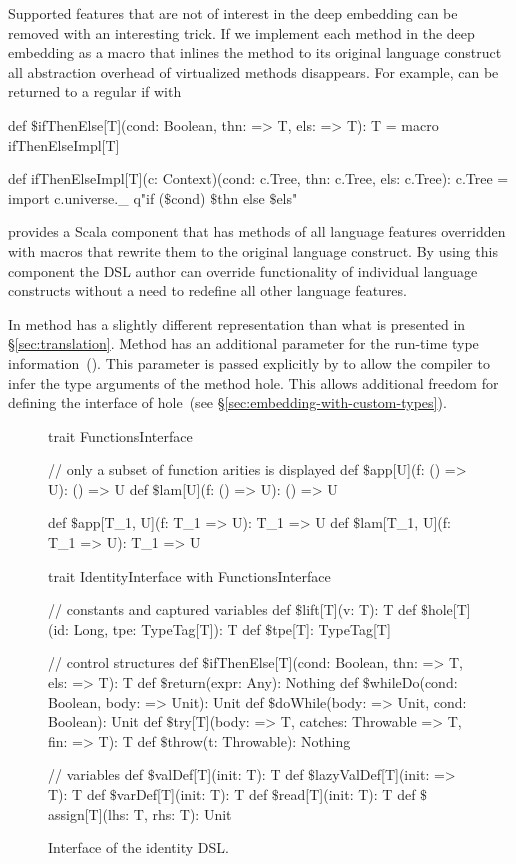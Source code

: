 Supported features that are not of interest in the deep embedding
 can be removed with an interesting trick. If we implement each method in the deep embedding as a macro
 that inlines the method to its original language construct all abstraction overhead of virtualized methods
 disappears. For example,  can be returned to a regular if with\begin{lstparagraph}
def $\$$ifThenElse[T](cond: Boolean, thn: => T, els: => T): T =
  macro ifThenElseImpl[T]

def ifThenElseImpl[T](c: Context)(cond: c.Tree,
  thn: c.Tree, els: c.Tree): c.Tree = { import c.universe._
  q"if ($\$$cond) $\$$thn else $\$$els"
}
\end{lstparagraph}

\yy provides a Scala component that has methods of all language features overridden with macros that rewrite
 them to the original language construct. By using this component the DSL author can override functionality
of individual language constructs without a need to redefine all other language features.

In  method  has a slightly different  representation than what is presented in \S \ref{sec:translation}. Method 
 has an additional parameter for the run-time type information~().
 This parameter is passed explicitly by \yy to allow the compiler to infer the type arguments
 of the method hole. This allows additional freedom for defining the interface of hole~(see \S \ref{sec:embedding-with-custom-types}).


\begin{figure}
\begin{listingtiny}
trait FunctionsInterface {
  // only a subset of function arities is displayed
  def $\$$app[U](f: () => U): () => U
  def $\$$lam[U](f: () => U): () => U

  def $\$$app[T_1, U](f: T_1 => U): T_1 => U
  def $\$$lam[T_1, U](f: T_1 => U): T_1 => U
}

trait IdentityInterface with FunctionsInterface {
  // constants and captured variables
  def $\$$lift[T](v: T): T
  def $\$$hole[T](id: Long, tpe: TypeTag[T]): T
  def $\$$tpe[T]: TypeTag[T]

  // control structures
  def $\$$ifThenElse[T](cond: Boolean, thn: => T, els: => T): T
  def $\$$return(expr: Any): Nothing
  def $\$$whileDo(cond: Boolean, body: => Unit): Unit
  def $\$$doWhile(body: => Unit, cond: Boolean): Unit
  def $\$$try[T](body: => T, catches: Throwable => T, fin: => T): T
  def $\$$throw(t: Throwable): Nothing

  // variables
  def $\$$valDef[T](init: T): T
  def $\$$lazyValDef[T](init: => T): T
  def $\$$varDef[T](init: T): T
  def $\$$read[T](init: T): T
  def $\$$assign[T](lhs: T, rhs: T): Unit
}
\end{listingtiny}
\caption{Interface of the identity DSL.}
\label{fig:interface-identity-dsl}
\end{figure}




